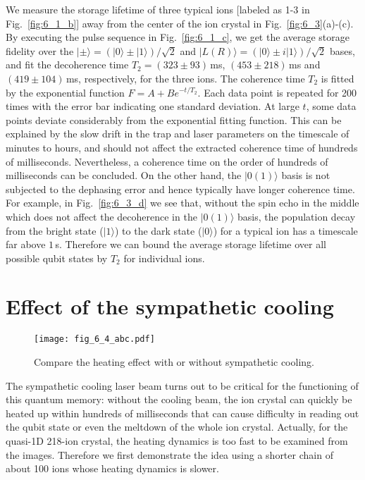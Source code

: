We measure the storage lifetime of three typical ions [labeled as 1-3 in Fig.~\ref{fig:6_1_b}] away from the center of the ion crystal in Fig.~\ref{fig:6_3}(a)-(c). By executing the pulse sequence in Fig.~\ref{fig:6_1_c}, we get the average storage fidelity over the $|\pm\rangle=(|0\rangle\pm|1\rangle)/\sqrt{2}$ and $|L(R)\rangle=(|0\rangle\pm i|1\rangle)/\sqrt{2}$ bases, and fit the decoherence time $T_2=(323\pm 93)\,$ms, $(453\pm218)\,$ms and $(419\pm104)\,$ms, respectively, for the three ions. The coherence time $T_2$ is fitted by the exponential function $F=A+Be^{-t/T_2}$. Each data point is repeated for 200 times with the error bar indicating one standard deviation. At large $t$, some data points deviate considerably from the exponential fitting function. This can be explained by the slow drift in the trap and laser parameters on the timescale of minutes to hours, and should not affect the extracted coherence time of hundreds of milliseconds. Nevertheless, a coherence time on the order of hundreds of milliseconds can be concluded. On the other hand, the $|0(1)\rangle$ basis is not subjected to the dephasing error and hence typically have longer coherence time. For example, in Fig.~\ref{fig:6_3_d} we see that, without the spin echo in the middle which does not affect the decoherence in the $|0(1)\rangle$ basis, the population decay from the bright state ($|1\rangle$) to the dark state ($|0\rangle$) for a typical ion has a timescale far above $1\,$s. Therefore we can bound the average storage lifetime over all possible qubit states by $T_2$ for individual ions.



\section{Effect of the sympathetic cooling}

\begin{figure}
    \centering
    \texttt{[image: fig\_6\_4\_abc.pdf]}    \caption{Compare the heating effect with or without sympathetic cooling.}
    \label{fig:6_4_abc}
\end{figure}

The sympathetic cooling laser beam turns out to be critical for the functioning of this quantum memory: without the cooling beam, the ion crystal can quickly be heated up within hundreds of milliseconds that can cause difficulty in reading out the qubit state or even the meltdown of the whole ion crystal. Actually, for the quasi-1D 218-ion crystal, the heating dynamics is too fast to be examined from the images. Therefore we first demonstrate the idea using a shorter chain of about 100 ions whose heating dynamics is slower.

